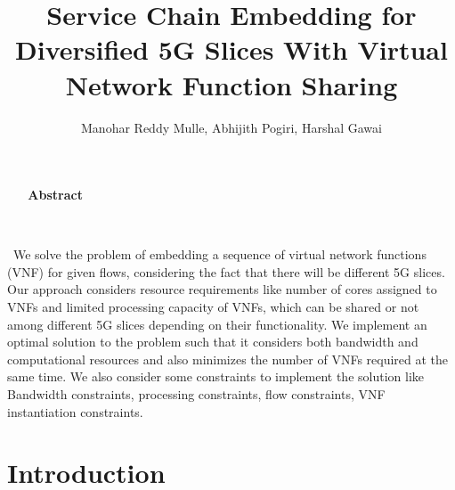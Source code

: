\documentclass{article}
\title{Service Chain Embedding for Diversified 5G Slices With Virtual Network Function Sharing}
\author{Manohar Reddy Mulle, Abhijith Pogiri, Harshal Gawai }
\begin{document}
\maketitle

\begin{center}
    \textbf{\large {Abstract}}
\end{center}
 \par
 We solve the problem of embedding a sequence of virtual network functions (VNF) for given flows, considering the fact that there will be different 5G slices. Our approach considers resource requirements like number of cores assigned to VNFs and limited processing capacity of VNFs, which can be shared or not among different 5G slices depending on their functionality. We implement an optimal solution to the problem such that it considers both bandwidth and computational resources and also minimizes the number of VNFs required at the same time. We also consider some constraints to implement the solution like Bandwidth constraints, processing constraints, flow constraints, VNF instantiation constraints.


\section{Introduction}
\end{document}
